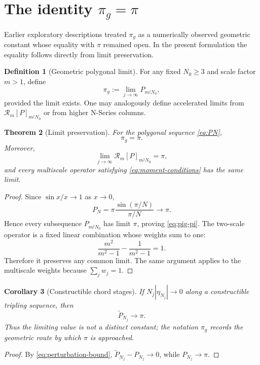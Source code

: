 \documentclass[12pt]{article}
\newtheorem{theorem}{Theorem}[section]
\newtheorem{corollary}[theorem]{Corollary}
\theoremstyle{definition}
\newtheorem{definition}[theorem]{Definition}
\theoremstyle{remark}
\newcommand{\Rop}{\mathcal{R}}
\newcommand{\abs}[1]{\left|#1\right|}
\begin{document}
\section{The identity $\pi_g=\pi$}
\label{sec:pig}

Earlier exploratory descriptions treated $\pi_g$ as a numerically observed
geometric constant whose equality with $\pi$ remained open.  In the present
formulation the equality follows directly from limit preservation.

\begin{definition}[Geometric polygonal limit]
For any fixed $N_0\ge3$ and scale factor $m>1$, define
\begin{equation}
  \pi_g:=\lim_{j\to\infty}P_{m^jN_0},
  \label{eq:pig-def}
\end{equation}
provided the limit exists.  One may analogously define accelerated limits from
$\Rop_m[P]_{m^jN_0}$ or from higher N-Series columns.
\end{definition}

\begin{theorem}[Limit preservation]
For the polygonal sequence \eqref{eq:PN},
\begin{equation}
  \pi_g=\pi.
  \label{eq:pig-pi}
\end{equation}
Moreover,
\[
  \lim_{j\to\infty}\Rop_m[P]_{m^jN_0}=\pi,
\]
and every multiscale operator satisfying
\eqref{eq:moment-conditions} has the same limit.
\end{theorem}

\begin{proof}
Since $\sin x/x\to1$ as $x\to0$,
\[
  P_N
  =\pi\frac{\sin(\pi/N)}{\pi/N}
  \longrightarrow\pi.
\]
Hence every subsequence $P_{m^jN_0}$ has limit $\pi$, proving
\eqref{eq:pig-pi}.  The two-scale operator is a fixed linear combination whose
weights sum to one:
\[
  \frac{m^2}{m^2-1}-\frac{1}{m^2-1}=1.
\]
Therefore it preserves any common limit.  The same argument applies to the
multiscale weights because $\sum_jw_j=1$.
\end{proof}

\begin{corollary}[Constructible chord stages]
If $N_j\abs{\eta_{N_j}}\to0$ along a constructible tripling sequence, then
\[
  \widetilde P_{N_j}\longrightarrow\pi.
\]
Thus the limiting value is not a distinct constant; the notation $\pi_g$
records the geometric route by which $\pi$ is approached.
\end{corollary}

\begin{proof}
By \eqref{eq:perturbation-bound},
$\widetilde P_{N_j}-P_{N_j}\to0$, while $P_{N_j}\to\pi$.
\end{proof}
\end{document}
